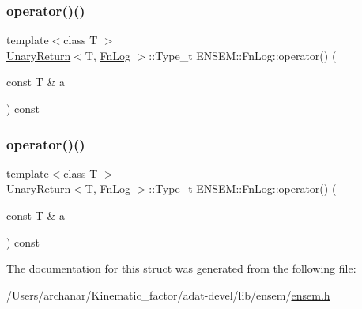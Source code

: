 \mbox{\label{structENSEM_1_1FnLog_a11b3aaca4dd06198708ed986afc66ba7}} 
\subsubsection{\texorpdfstring{operator()()}{operator()()}\hspace{0.1cm}{\footnotesize\ttfamily [2/3]}}
{\footnotesize\ttfamily template$<$class T $>$ \\
\mbox{\hyperlink{structENSEM_1_1UnaryReturn}{Unary\+Return}}$<$T, \mbox{\hyperlink{structENSEM_1_1FnLog}{Fn\+Log}} $>$\+::Type\+\_\+t E\+N\+S\+E\+M\+::\+Fn\+Log\+::operator() (\begin{DoxyParamCaption}\item[{const T \&}]{a }\end{DoxyParamCaption}) const\hspace{0.3cm}{\ttfamily [inline]}}

\mbox{\label{structENSEM_1_1FnLog_a11b3aaca4dd06198708ed986afc66ba7}} 
\subsubsection{\texorpdfstring{operator()()}{operator()()}\hspace{0.1cm}{\footnotesize\ttfamily [3/3]}}
{\footnotesize\ttfamily template$<$class T $>$ \\
\mbox{\hyperlink{structENSEM_1_1UnaryReturn}{Unary\+Return}}$<$T, \mbox{\hyperlink{structENSEM_1_1FnLog}{Fn\+Log}} $>$\+::Type\+\_\+t E\+N\+S\+E\+M\+::\+Fn\+Log\+::operator() (\begin{DoxyParamCaption}\item[{const T \&}]{a }\end{DoxyParamCaption}) const\hspace{0.3cm}{\ttfamily [inline]}}



The documentation for this struct was generated from the following file\+:\begin{DoxyCompactItemize}
\item 
/\+Users/archanar/\+Kinematic\+\_\+factor/adat-\/devel/lib/ensem/\mbox{\hyperlink{adat-devel_2lib_2ensem_2ensem_8h}{ensem.\+h}}\end{DoxyCompactItemize}
